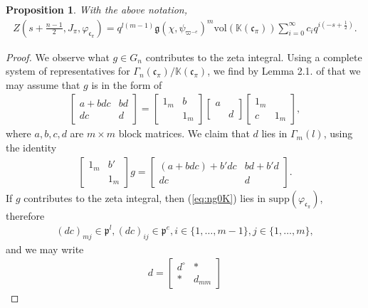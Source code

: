\documentclass[11pt]{amsart}
\newcommand\Vp{\varpi}%
\newcommand\vp{\varphi}%
\newcommand\p{{\mathfrak{p}}}
\newcommand\cf{{\mathfrak{c}}}
\newcommand\gf{\mathfrak{g}}
\newcommand\K{{\mathbb{K}}}
\newcommand\1{\mathbf{1}}
\newcommand\tm{\times}
\newcommand\supp{{\mathrm{supp}}}%
\newcommand\vol{{\mathrm{vol}}}
\numberwithin{equation}{section}
\newtheorem{prop}[thm]{Proposition}
\begin{document}
\begin{prop}\label{prop:ZJPhi}
With the above notation, 
\begin{align*}
Z(s + \frac{n-1}{2}, J_\pi, \vp_{\cf_\pi}) = q^{l(m-1)} \gf(\chi,\psi_{\Vp^{-e}})^{m}\vol(\K(\cf_\pi)) \sum_{i = 0}^\infty c_i q^{i(-s+\frac{1}{2})}.
\end{align*} 
\end{prop}
\begin{proof}
We observe what $g \in G_n$ contributes to the zeta integral.
Using a complete system of representatives for $\Gamma_{n}(\cf_\pi)/\K(\cf_\pi)$, we find by Lemma 2.1. of \cite{K-Y} that we may assume that $g$ is in the form of 
\begin{align}
\begin{bmatrix}
a + bdc & bd  \\
dc & d 
\end{bmatrix} = \begin{bmatrix}
1_m & b   \\
& 1_m 
\end{bmatrix}\begin{bmatrix}
a &  \\
& d
\end{bmatrix}\begin{bmatrix}
1_m &  \\
c & 1_m
\end{bmatrix}, 
\label{eq:ng0K}
\end{align} 
where $a,b,c,d$ are $m \tm m$ block matrices.
We claim that $d$ lies in $\Gamma_m(l)$, using the identity
\begin{align}
\begin{bmatrix}
1_m & b' \\
& 1_m
\end{bmatrix} g = \begin{bmatrix}
(a + b dc) + b' dc & bd + b' d  \\
dc & d 
\end{bmatrix}. \label{eq:dingammal}
\end{align}
If $g$ contributes to the zeta integral, then (\ref{eq:ng0K}) lies in $\supp(\vp_{\cf_\pi})$,  therefore 
\begin{align}
(dc)_{mj} \in \p^l, (dc)_{ij} \in \p^e, i \in \{1, \ldots, m-1\}, j \in \{1, \ldots, m\}, \label{eq:dcmj}
\end{align} 
and we may write
\begin{align*}
d = \begin{bmatrix}
d^\circ & *  \\
* & d_{mm}

\end{bmatrix}
\end{align*}
\end{proof}
\end{document}
